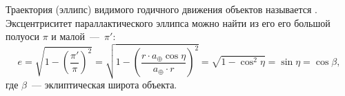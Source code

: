 Траектория (эллипс) видимого годичного движения объектов называется . Эксцентриситет параллактического эллипса можно найти из его его большой полуоси $\pi$ и малой~---~$\pi'$:
\begin{equation*}
	e
	= \sqrt{1 - \left(\frac{\pi'}{\pi} \right)^2}
	= \sqrt{1 - \left( \frac{r \cdot a_\oplus \cos \eta}{a_\oplus \cdot r}\right)^2}
	= \sqrt{1 - \cos^2 \eta} = \sin \eta = \cos \beta,
\end{equation*}
где $\beta$~--- эклиптическая широта объекта.


